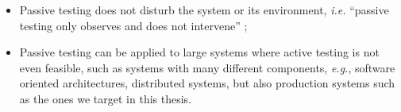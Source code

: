 \begin{itemize}
    \item Passive testing does not disturb the system or its
        environment, \emph{i.e.} \enquote{passive testing only
        observes and does not intervene} \cite{cavalli2003new};

    \item Passive testing can be applied to large systems where
        active testing is not even feasible, such as systems with
        many different components, \emph{e.g.}, software oriented
        architectures, distributed systems, but also production
        systems such as the ones we target in this thesis.
\end{itemize}
